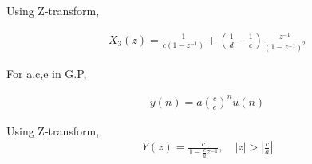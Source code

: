 \documentclass[journal,12pt,twocolumn]{IEEEtran}
\providecommand{\brak}[1]{\ensuremath{\left(#1\right)}}
\theoremstyle{remark}
\providecommand{\abs}[1]{\left\vert#1\right\vert}
\begin{document}
Using Z-transform,

\begin{align}
X_3(z) = \frac{1}{c(1-z^{-1})} + \brak{\frac{1}{d} - \frac{1}{c}}\frac{z^{-1}}{(1-z^{-1})^2}
\end{align}

For a,c,e in G.P,

\begin{align}
y(n) = a\brak{\frac{c}{e}}^n u(n)
\end{align}

Using Z-transform,
\begin{align}
Y(z) = \frac{c}{1-\frac{c}{a}z^{-1}}, \quad \abs{z}>\abs{\frac{c}{a}}
\end{align}
\end{document}
